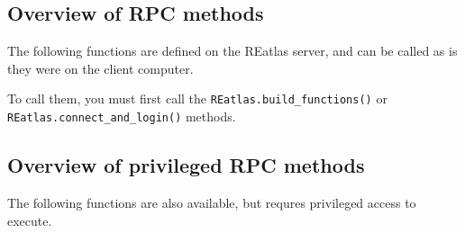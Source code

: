 \documentclass[a4paper,10pt]{article}
\begin{document}
\subsection{Overview of RPC methods}

The following functions are defined on the REatlas server,
and can be called as is they were on the client computer.

To call them, you must first call the \verb+REatlas.build_functions()+ or
\verb+REatlas.connect_and_login()+ methods. 

\begin{changemargin}{-1.5cm}{1.5cm}

\end{changemargin}

\subsection{Overview of privileged RPC methods}

The following functions are also available,
but requres privileged access to execute.

\begin{changemargin}{-1.5cm}{1.5cm}

\end{changemargin}


\newpage 

{}

\end{document}
